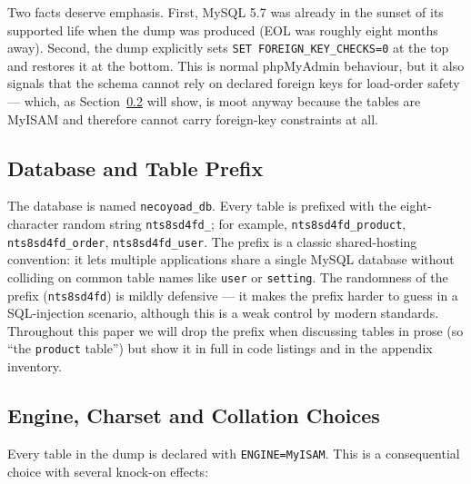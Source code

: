 \documentclass[11pt,a4paper]{article}
\begin{document}
Two facts deserve emphasis. First, MySQL 5.7 was already in the sunset of
its supported life when the dump was produced (EOL was roughly eight months
away). Second, the dump explicitly sets \texttt{SET FOREIGN\_KEY\_CHECKS=0}
at the top and restores it at the bottom. This is normal phpMyAdmin behaviour,
but it also signals that the schema cannot rely on declared foreign keys for
load-order safety --- which, as Section~\ref{sec:engine} will show, is
moot anyway because the tables are MyISAM and therefore cannot carry
foreign-key constraints at all.

\subsection{Database and Table Prefix}

The database is named \texttt{necoyoad\_db}. Every table is prefixed with
the eight-character random string \texttt{nts8sd4fd\_}; for example,
\texttt{nts8sd4fd\_product}, \texttt{nts8sd4fd\_order},
\texttt{nts8sd4fd\_user}. The prefix is a classic shared-hosting convention:
it lets multiple applications share a single MySQL database without
colliding on common table names like \texttt{user} or \texttt{setting}.
The randomness of the prefix (\texttt{nts8sd4fd}) is mildly defensive ---
it makes the prefix harder to guess in a SQL-injection scenario, although
this is a weak control by modern standards. Throughout this paper we
will drop the prefix when discussing tables in prose (so
``the \texttt{product} table'') but show it in full in code listings and
in the appendix inventory.

\subsection{Engine, Charset and Collation Choices}\label{sec:engine}

Every table in the dump is declared with \texttt{ENGINE=MyISAM}. This is
a consequential choice with several knock-on effects:
\end{document}
